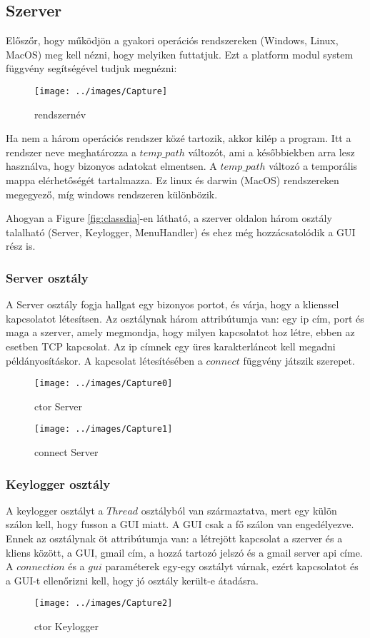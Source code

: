 \documentclass[a4paper, 11pt]{article}
\begin{document}
\subsection{Szerver}\label{subsec:server}
Előszőr, hogy működjön a gyakori operációs rendszereken (Windows, Linux, MacOS) meg kell nézni, hogy melyiken futtatjuk. Ezt a platform modul system függvény segítségével tudjuk megnézni:
\begin{figure}[H]
\centering
\texttt{[image: ../images/Capture]}
\caption{rendszernév}
\label{fig:sysname}
\end{figure}

\noindent Ha nem a három operációs rendszer közé tartozik, akkor kilép a program. Itt a rendszer neve meghatározza a $temp\_path$ változót, ami a későbbiekben arra lesz használva, hogy bizonyos adatokat elmentsen. A $temp\_path$ változó a temporális mappa elérhetőségét tartalmazza. Ez linux és darwin (MacOS) rendszereken megegyező, míg windows rendszeren különbözik.

Ahogyan a Figure \ref{fig:classdia}-en látható, a szerver oldalon három osztály talalható (Server, Keylogger, MenuHandler) és ehez még hozzácsatolódik a GUI rész is.

\subsubsection{Server osztály}\label{subsubsec:serverclass}
A Server osztály fogja hallgat egy bizonyos portot, és várja, hogy a klienssel kapcsolatot létesítsen. Az osztálynak három attribútumja van: egy ip cím, port és maga a szerver, amely megmondja, hogy milyen kapcsolatot hoz létre, ebben az esetben TCP kapcsolat. Az ip címnek egy üres karakterláncot kell megadni példányosításkor. A kapcsolat létesítésében a $connect$ függvény játszik szerepet.
\begin{figure}[H]
\centering
\texttt{[image: ../images/Capture0]}
\caption{ctor Server}
\label{fig:ctorserver}
\end{figure}

\begin{figure}[H]
\centering
\texttt{[image: ../images/Capture1]}
\caption{connect Server}
\label{fig:connect}
\end{figure}

\subsubsection{Keylogger osztály}\label{subsubsec:keyloggerclass}
A keylogger osztályt a $Thread$ osztályból van származtatva, mert egy külön szálon kell, hogy fusson a GUI miatt. A GUI csak a fő szálon van engedélyezve. Ennek az osztálynak öt attribútumja van: a létrejött kapcsolat a szerver és a kliens között, a GUI, gmail cím, a hozzá tartozó jelszó és a gmail server api címe. A $connection$ és a $gui$ paraméterek egy-egy osztályt várnak, ezért kapcsolatot és a GUI-t ellenőrizni kell, hogy jó osztály került-e átadásra.
\begin{figure}[H]
\centering
\texttt{[image: ../images/Capture2]}
\caption{ctor Keylogger}
\label{fig:ctorkeylogger}
\end{figure}
\end{document}
